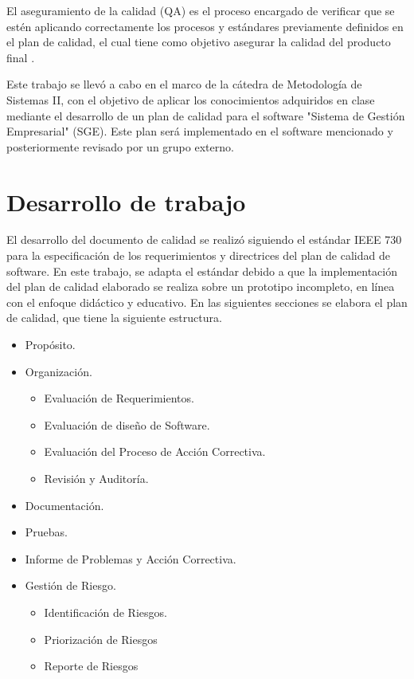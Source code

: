 \documentclass[a4paper,10pt]{article}
\begin{document}
	El aseguramiento de la calidad (QA) es el proceso encargado de verificar que se estén aplicando correctamente los procesos y estándares previamente definidos en el plan de calidad, el cual tiene como objetivo asegurar la calidad del producto final \parencite{Sommerville_2011}.
	
	Este trabajo se llevó a cabo en el marco de la cátedra de Metodología de Sistemas II, con el objetivo de aplicar los conocimientos adquiridos en clase mediante el desarrollo de un plan de calidad para el software "Sistema de Gestión Empresarial" (SGE). Este plan será implementado en el software mencionado y posteriormente revisado por un grupo externo.
	
	\section{Desarrollo de trabajo}
	El desarrollo del documento de calidad se realizó siguiendo el estándar IEEE 730 \parencite{IEEE_Standards_Association} para la especificación de los requerimientos y directrices del plan de calidad de software. En este trabajo, se adapta el estándar debido a que la implementación del plan de calidad elaborado se realiza sobre un prototipo incompleto, en línea con el enfoque didáctico y educativo. En las siguientes secciones se elabora el plan de calidad, que tiene la siguiente estructura.
	
	\begin{itemize}
		\item Propósito.
		\item Organización.
		\begin{itemize}
			\item Evaluación de Requerimientos.
			\item Evaluación de diseño de Software.
			\item Evaluación del Proceso de Acción Correctiva.
			\item Revisión y Auditoría.
		\end{itemize}
		\item Documentación.
		\item Pruebas.
		\item Informe de Problemas y Acción Correctiva.
		\item Gestión de Riesgo.
		\begin{itemize}
			\item Identificación de Riesgos.
			\item Priorización de Riesgos
			\item Reporte de Riesgos
		\end{itemize}
	\end{itemize}
	
\end{document}

